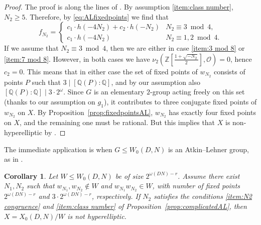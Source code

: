 \documentclass[12pt]{amsart}
\newcommand{\Q}{\mathbb{Q}}
\newcommand{\Z}{\mathbb{Z}}
\newcommand{\calO}{\mathcal{O}}
\numberwithin{equation}{subsection}
\theoremstyle{plain}\newtheorem{ithm}{Theorem}
\theoremstyle{plain}\newtheorem{iprop}[ithm]{Proposition}
\newtheorem{corollary}[equation]{Corollary}
\theoremstyle{definition}
\theoremstyle{remark}
\newcommand{\Order}{\calO} %
\newcommand{\Curve}[2]{X_0({#1},{#2})} %
\newcommand{\ALfull}[2]{W_0({#1},{#2})} %
\begin{document}
\begin{proof}
    The proof is along the lines of \cite[Proposition 6]{FH99}. By assumption \eqref{item:class number}, $N_2 \ge 5$. Therefore, by \eqref{eq:ALfixedpoints} we find that 
    $$
    f_{N_2} = \begin{cases}
        c_1 \cdot h(-4N_2) + c_2 \cdot h(-N_2) & N_2 \equiv 3 \bmod 4, \\
        c_1 \cdot h(-4N_2) & N_2 \equiv 1,2 \bmod 4.
    \end{cases}
    $$
    If we assume that $N_2 \equiv 3 \bmod 4$, then we are either in case \eqref{item:3 mod 8} or \eqref{item:7 mod 8}. However, in both cases we have $\nu_2 \left(\Z[\frac{1+\sqrt{-N_2}}{2}], \Order \right) = 0$, hence $c_2 = 0$.
    This means that in either case the set of fixed points of $w_{N_2}$ consists of points $P$ such that $3 \mid [\Q(P) : \Q]$, and by our assumption also $[\Q(P) : \Q]  \mid 3 \cdot 2^{\omega}$. Since $G$ is an elementary $2$-group acting freely on this set (thanks to our assumption on $g_1$), it contributes to three conjugate fixed points of $w_{N_2}$ on $X$. By Proposition~\ref{prop:fixedpointsAL}, $w_{N_2}$ has exactly four fixed points on $X$, and the remaining one must be rational. But this implies that $X$ is non-hyperelliptic by \cite[Proposition 6]{HasegawaStarcurves}.
\end{proof}

The immediate application is when $G \le \ALfull{D}{N}$ is an  Atkin--Lehner group, as in \cite{FH99}.

\begin{corollary}
    Let $W \le \ALfull{D}{N}$ be of size $2^{\omega(DN) - r}$.
    Assume there exist $N_1, N_2$ such that $w_{N_1}, w_{N_2} \notin W$ and $w_{N_1} w_{N_2} \in W$, with number of fixed points $2^{\omega(DN)-r}$ and $3 \cdot 2^{\omega(DN)-r}$, respectively. If $N_2$ satisfies the conditions \eqref{item:N2 congruence} and \eqref{item:class number} of Proposition~\ref{prop:complicatedAL}, then $X = \Curve{D}{N}/W$ is not hyperelliptic.
\end{corollary}
\end{document}
